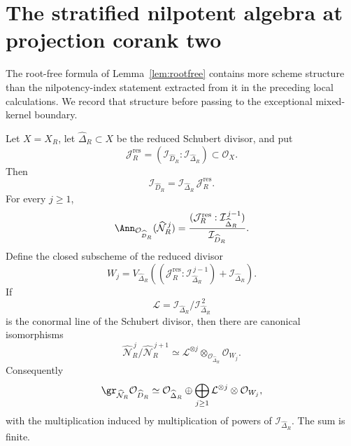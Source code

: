 \section{The stratified nilpotent algebra at projection corank two}
\label{sec:stratified-nilpotent}

The root-free formula of Lemma~\ref{lem:rootfree} contains more
scheme structure than the nilpotency-index statement extracted from it
in the preceding local calculations.  We record that structure before passing
to the exceptional mixed-kernel boundary.

\begin{theorem}
\label{thm:global-residual-colon}
Let \(X=X_R\), let \(\widehat\Delta_R\subset X\) be the reduced
Schubert divisor, and put
\[
 \mathcal J_R^{\mathrm{res}}
 =
 (\mathcal I_{\widehat D_R}:\mathcal I_{\widehat\Delta_R})
 \subset\mathcal O_X.
\]
Then
\begin{equation}\label{eq:global-residual-factorization}
 \mathcal I_{\widehat D_R}
 =
 \mathcal I_{\widehat\Delta_R}\,
 \mathcal J_R^{\mathrm{res}}.
\end{equation}
For every \(j\ge1\),
\begin{equation}\label{eq:global-ann-colon}
 \Ann_{\mathcal O_{\widehat D_R}}
      (\widehat{\mathcal N}_R^{\,j})
 =
 \frac{
   (\mathcal J_R^{\mathrm{res}}:
    \mathcal I_{\widehat\Delta_R}^{\,j-1})
 }{\mathcal I_{\widehat D_R}}.
\end{equation}
Define the closed subscheme of the reduced divisor
\begin{equation}\label{eq:Wj-definition}
 W_j=
 V_{\widehat\Delta_R}\!\left(
  (\mathcal J_R^{\mathrm{res}}:
   \mathcal I_{\widehat\Delta_R}^{\,j-1})
  +\mathcal I_{\widehat\Delta_R}\right).
\end{equation}
If
\[
 \mathcal L=
 \mathcal I_{\widehat\Delta_R}/
 \mathcal I_{\widehat\Delta_R}^{\,2}
\]
is the conormal line of the Schubert divisor, then there are canonical
isomorphisms
\begin{equation}\label{eq:global-graded-piece}
 \widehat{\mathcal N}_R^{\,j}/
 \widehat{\mathcal N}_R^{\,j+1}
 \simeq
 \mathcal L^{\otimes j}\otimes_{\mathcal O_{\widehat\Delta_R}}
 \mathcal O_{W_j}.
\end{equation}
Consequently
\begin{equation}\label{eq:global-gr-colon}
 \gr_{\widehat{\mathcal N}_R}\mathcal O_{\widehat D_R}
 \simeq
 \mathcal O_{\widehat\Delta_R}
 \oplus
 \bigoplus_{j\ge1}
 \mathcal L^{\otimes j}\otimes\mathcal O_{W_j},
\end{equation}
with the multiplication induced by multiplication of powers of
\(\mathcal I_{\widehat\Delta_R}\).  The sum is finite.


\end{theorem}

